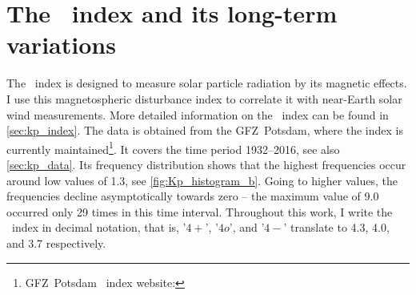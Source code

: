 \section{The \Kp~index and its long-term variations}
\label{sec:kp_long_term_variations}
The \Kp~index is designed to measure solar particle radiation by its magnetic effects. I use this magnetospheric disturbance index to correlate it with near-Earth solar wind measurements. More detailed information on the \Kp~index can be found in \autoref{sec:kp_index}.
The \Kp{} data is obtained from the GFZ~Potsdam, where the index is currently maintained\footnote{GFZ~Potsdam \Kp~index website: }. It covers the time period 1932--2016, see also \autoref{sec:kp_data}. Its frequency distribution shows that the highest frequencies occur around low \Kp{} values of \num{1.3}, see \autoref{fig:Kp_histogram_b}. Going to higher \Kp{} values, the frequencies decline asymptotically towards zero -- the maximum \Kp{} value of \num{9.0} occurred only 29 times in this time interval. Throughout this work, I write the \Kp~index in decimal notation, that is, '$4+$', '$4o$', and '$4-$' translate to 4.3, 4.0, and 3.7 respectively.

